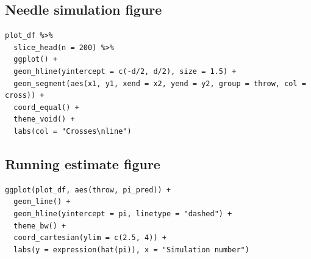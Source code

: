\documentclass[11pt]{article}
\begin{document}
\subsection{Needle simulation figure}

\begin{verbatim}
plot_df %>%
  slice_head(n = 200) %>%
  ggplot() +
  geom_hline(yintercept = c(-d/2, d/2), size = 1.5) +
  geom_segment(aes(x1, y1, xend = x2, yend = y2, group = throw, col = cross)) +
  coord_equal() +
  theme_void() +
  labs(col = "Crosses\nline")
\end{verbatim}

\subsection{Running estimate figure}

\begin{verbatim}
ggplot(plot_df, aes(throw, pi_pred)) +
  geom_line() +
  geom_hline(yintercept = pi, linetype = "dashed") +
  theme_bw() +
  coord_cartesian(ylim = c(2.5, 4)) +
  labs(y = expression(hat(pi)), x = "Simulation number")
\end{verbatim}

\printbibliography
\end{document}
